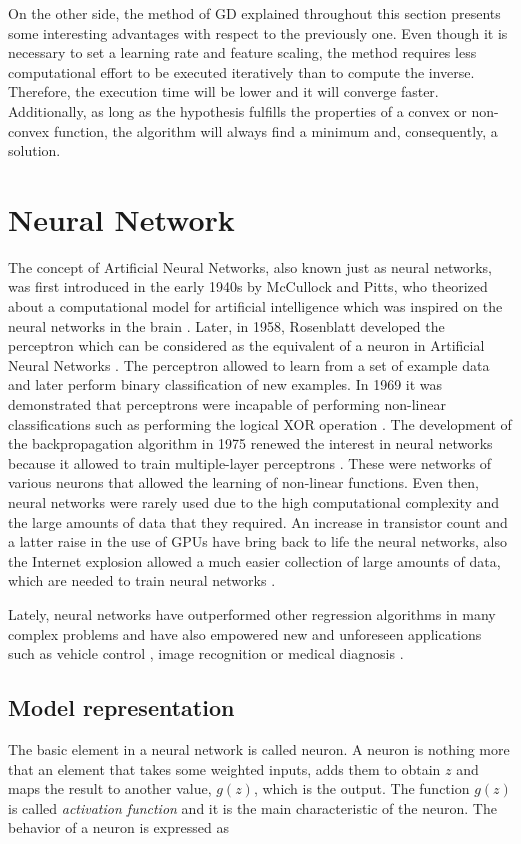 \documentclass[a4paper, report, oneside, UKenglish]{memoir}
\begin{document}
On the other side, the method of GD explained throughout this section presents some interesting advantages with respect to the previously one. Even though it is necessary to set a learning rate and feature scaling, the method requires less computational effort to be executed iteratively than to compute the inverse. Therefore, the execution time will be lower and it will converge faster. Additionally, as long as the hypothesis fulfills the properties of a convex or non-convex function, the algorithm will always find a minimum and, consequently, a solution. 


\section{Neural Network}
The concept of Artificial Neural Networks, also known just as neural networks, was first introduced in the early 1940s by McCullock and Pitts, who theorized about a computational model for artificial intelligence which was inspired on the neural networks in the brain \cite{mcculloch_logical_1943}. Later, in 1958, Rosenblatt developed the perceptron which can be considered as the equivalent of a neuron in Artificial Neural Networks \cite{rosenblatt_perceptron_1958}. The perceptron allowed to learn from a set of example data and later perform binary classification of new examples. In 1969 it was demonstrated that perceptrons were incapable of performing non-linear classifications such as performing the logical XOR operation \cite{minsky69perceptrons}. The development of the backpropagation algorithm in 1975 renewed the interest in neural networks because it allowed to train multiple-layer perceptrons \cite{werbos}. These were networks of various neurons that allowed the learning of non-linear functions. Even then, neural networks were rarely used due to the high computational complexity and the large amounts of data that they required. An increase in transistor count and a latter raise in the use of GPUs have bring back to life the neural networks, also the Internet explosion allowed a much easier collection of large amounts of data, which are needed to train neural networks \cite{aggarwal_neural_2018}.

Lately, neural networks have outperformed other regression algorithms in many complex problems and have also empowered new and unforeseen applications such as vehicle control \cite{BojarskiTDFFGJM16}, image recognition \cite{hijazi2015} or medical diagnosis \cite{AMATO201347}.

\subsection{Model representation}
The basic element in a neural network is called neuron. A neuron is nothing more that an element that takes some weighted inputs, adds them to obtain $z$ and maps the result to another value, $g(z)$, which is the output. The function $g(z)$ is called \textit{activation function} and it is the main characteristic of the neuron. The behavior of a neuron is expressed as
\end{document}
